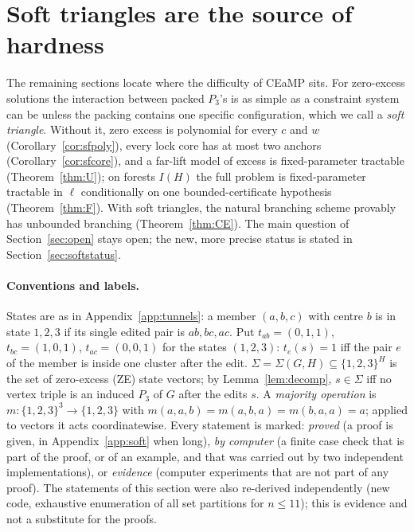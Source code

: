 \section{Soft triangles are the source of hardness}\label{sec:soft}
The remaining sections locate where the difficulty of CEaMP sits. For zero-excess solutions the interaction between packed $P_3$'s is as simple as a constraint system can be unless the packing contains one specific configuration, which we call a \emph{soft triangle}. Without it, zero excess is polynomial for every $c$ and $w$ (Corollary~\ref{cor:sfpoly}), every lock core has at most two anchors (Corollary~\ref{cor:sfcore}), and a far-lift model of excess is fixed-parameter tractable (Theorem~\ref{thm:U}); on forests $I(H)$ the full problem is fixed-parameter tractable in $\ell$ conditionally on one bounded-certificate hypothesis (Theorem~\ref{thm:F}). With soft triangles, the natural branching scheme provably has unbounded branching (Theorem~\ref{thm:CE}). The main question of Section~\ref{sec:open} stays open; the new, more precise status is stated in Section~\ref{sec:softstatus}.

\paragraph{Conventions and labels.}
States are as in Appendix~\ref{app:tunnels}: a member $(a,b,c)$ with centre $b$ is in state $1,2,3$ if its single edited pair is $ab,bc,ac$. Put $t_{ab}=(0,1,1)$, $t_{bc}=(1,0,1)$, $t_{ac}=(0,0,1)$ for the states $(1,2,3)$: $t_e(s)=1$ iff the pair $e$ of the member is inside one cluster after the edit. $\Sigma=\Sigma(G,H)\subseteq\{1,2,3\}^H$ is the set of zero-excess (ZE) state vectors; by Lemma~\ref{lem:decomp}, $s\in\Sigma$ iff no vertex triple is an induced $P_3$ of $G$ after the edits $s$. A \emph{majority operation} is $m:\{1,2,3\}^3\to\{1,2,3\}$ with $m(a,a,b)=m(a,b,a)=m(b,a,a)=a$; applied to vectors it acts coordinatewise. Every statement is marked: \emph{proved} (a proof is given, in Appendix~\ref{app:soft} when long), \emph{by computer} (a finite case check that is part of the proof, or of an example, and that was carried out by two independent implementations), or \emph{evidence} (computer experiments that are not part of any proof). The statements of this section were also re-derived independently (new code, exhaustive enumeration of all set partitions for $n\le 11$); this is evidence and not a substitute for the proofs.

